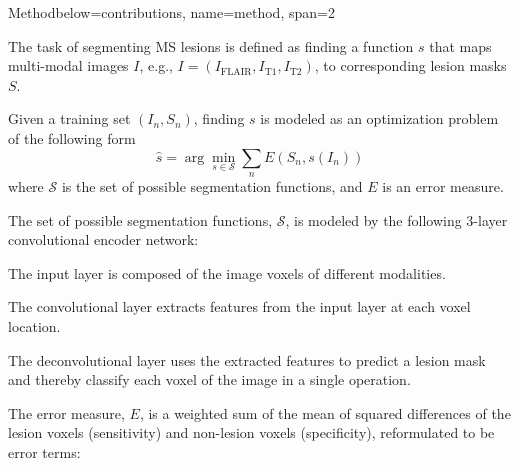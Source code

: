 \documentclass[%
portrait,paperwidth=841mm,paperheight=1180mm,%
margin=2cm,
fontscale=0.32
]{baposter}
\begin{document}
\begin{poster}
\begin{headerblock}{Method}{below=contributions, name=method, span=2}
\begin{compactitem}
\item The task of segmenting MS lesions is defined as finding a function $s$
that maps multi-modal images $I$, e.g., $I = (I_\text{FLAIR}, I_\text{T1},
I_\text{T2})$, to corresponding lesion masks $S$.
\item Given a training set $(I_n,S_n)$, finding $s$ is modeled as an
optimization problem of the following form
\begin{equation}
\nonumber
\hat{s} = \arg \min_{s \in \mathcal{S}} \sum_n E(S_n, s(I_n))
\label{eq:segprob}
\end{equation}
where $\mathcal{S}$ is the set of possible segmentation functions, and $E$ is an
error measure.
\item The set of possible segmentation functions, $\mathcal{S}$, is modeled by
the following 3-layer convolutional encoder network:
\end{compactitem}
\vspace{0.5em}
\begin{center}

\end{center}
\vspace{0em}
% 
\begin{compactitem}
\item The input layer is composed of the image voxels of different
modalities.
\item The convolutional layer extracts features from the input layer at
each voxel location.
\item The deconvolutional layer uses the extracted features to predict a lesion
mask and thereby classify each voxel of the image in a single operation.
\item The error measure, $E$, is a weighted sum of the mean of squared
differences of the lesion voxels (sensitivity) and non-lesion voxels
(specificity), reformulated to be error terms:
\end{compactitem}

\end{headerblock}
\end{poster}
\end{document}
